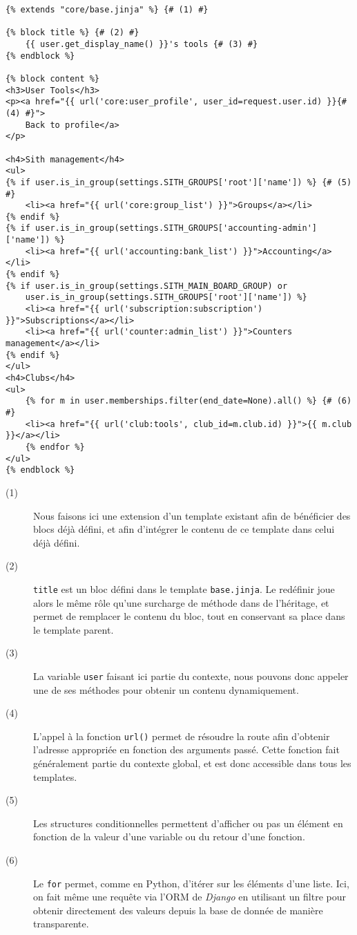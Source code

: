 \documentclass[a4paper]{report}
\begin{document}
\begin{addmargin}[-4em]{0em}
    \begin{verbatim}
{% extends "core/base.jinja" %} {# (1) #}

{% block title %} {# (2) #}
    {{ user.get_display_name() }}'s tools {# (3) #}
{% endblock %}

{% block content %}
<h3>User Tools</h3>
<p><a href="{{ url('core:user_profile', user_id=request.user.id) }}{# (4) #}">
    Back to profile</a>
</p>

<h4>Sith management</h4>
<ul>
{% if user.is_in_group(settings.SITH_GROUPS['root']['name']) %} {# (5) #}
    <li><a href="{{ url('core:group_list') }}">Groups</a></li>
{% endif %}
{% if user.is_in_group(settings.SITH_GROUPS['accounting-admin']['name']) %}
    <li><a href="{{ url('accounting:bank_list') }}">Accounting</a></li>
{% endif %}
{% if user.is_in_group(settings.SITH_MAIN_BOARD_GROUP) or
    user.is_in_group(settings.SITH_GROUPS['root']['name']) %}
    <li><a href="{{ url('subscription:subscription') }}">Subscriptions</a></li>
    <li><a href="{{ url('counter:admin_list') }}">Counters management</a></li>
{% endif %}
</ul>
<h4>Clubs</h4>
<ul>
    {% for m in user.memberships.filter(end_date=None).all() %} {# (6) #}
    <li><a href="{{ url('club:tools', club_id=m.club.id) }}">{{ m.club }}</a></li>
    {% endfor %}
</ul>
{% endblock %}
    \end{verbatim}
\end{addmargin}

\begin{description}
    \item[(1)] Nous faisons ici une extension d'un template existant afin de bénéficier des blocs déjà défini, et afin
        d'intégrer le contenu de ce template dans celui déjà défini.
    \item[(2)] \verb#title# est un bloc défini dans le template \verb#base.jinja#. Le redéfinir joue alors le même rôle
        qu'une surcharge de méthode dans de l'héritage, et permet de remplacer le contenu du bloc, tout en conservant sa
        place dans le template parent.
    \item[(3)] La variable \verb#user# faisant ici partie du contexte, nous pouvons donc appeler une de ses méthodes
        pour obtenir un contenu dynamiquement.
    \item[(4)] L'appel à la fonction \verb#url()# permet de résoudre la route afin d'obtenir l'adresse appropriée en
        fonction des arguments passé. Cette fonction fait généralement partie du contexte global, et est donc accessible
        dans tous les templates.
    \item[(5)] Les structures conditionnelles permettent d'afficher ou pas un élément en fonction de la valeur d'une
        variable ou du retour d'une fonction.
    \item[(6)] Le \verb#for# permet, comme en Python, d'itérer sur les éléments d'une liste. Ici, on fait même une
        requête via l'ORM de \emph{Django} en utilisant un filtre pour obtenir directement des valeurs depuis la base de
        donnée de manière transparente.
\end{description}
\end{document}

